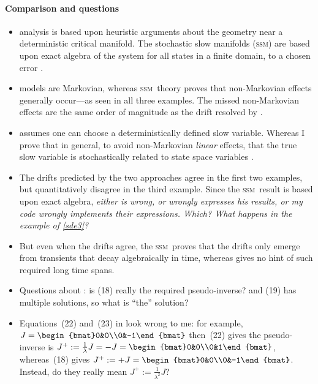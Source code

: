 \documentclass[11pt,a5paper]{article}
\numberwithin{equation}{section}
\def\ssm{\textsc{ssm}}
\begin{document}
\paragraph{Comparison and questions}
\begin{itemize}
\item \cite{Katzenberger91} analysis is based upon heuristic arguments about the geometry near a deterministic critical manifold.
The stochastic slow manifolds (\ssm) are based upon exact algebra of the system for all states in a finite domain, to a chosen error \cite[e.g.,][]{Roberts06k}.%

\item \cite{Katzenberger91} models are Markovian, whereas \ssm\ theory proves that non-Markovian effects generally occur---as seen in all three examples.  The missed non-Markovian effects are the same order of magnitude as the drift resolved by \cite{Katzenberger91}.

\item \cite{Katzenberger91} assumes one can choose a deterministically defined slow variable.  Whereas I prove that in general, to avoid non-Markovian \emph{linear} effects, that the true slow variable is stochastically related to state space variables \cite[e.g.,][]{Roberts06k}.

\item The drifts predicted by the two approaches agree in the first two examples, but quantitatively disagree in the third example.  Since the \ssm\ result is based upon exact algebra, \emph{either \cite{Katzenberger91} is wrong, or \cite{Parsons2015, Parsons2017} wrongly expresses his results, or my code wrongly implements their expressions.  Which?  What happens in the example of \cref{sde3}?}

\item But even when the drifts agree, the \ssm\ proves that the drifts only emerge from transients that decay algebraically in time, whereas \cite{Katzenberger91} gives no hint of such required long time spans.

\item Questions about \cite{Parsons2015, Parsons2017}: is (18) really the required pseudo-inverse?  and (19) has multiple solutions, so what is ``the'' solution?

\item Equations~(22) and~(23) in \cite{Parsons2017} look wrong to me:  for example, \(J=\begin{bmat}0&0\\0&-1\end{bmat}\) then~(22) gives the pseudo-inverse is \(J^+:=\frac1\lambda J=-J=\begin{bmat}0&0\\0&1\end{bmat}\), whereas~(18) gives \(J^+:=+J=\begin{bmat}0&0\\0&-1\end{bmat}\).  Instead, do they really mean \(J^+:=\frac1{\lambda^2}J\)?


\end{itemize}
\end{document}
